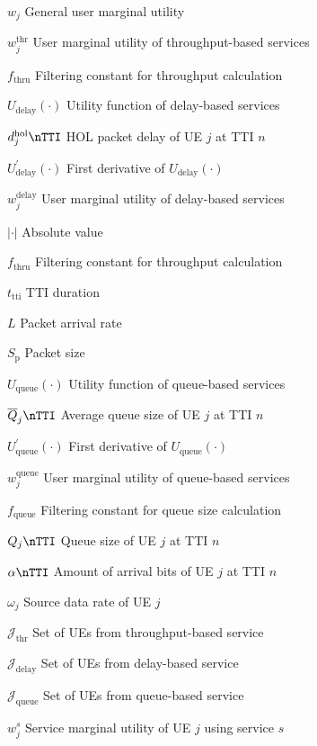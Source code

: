 \begin{simbolos}
	\item[$ w_j $ ] General user marginal utility
	\item[$ w^{\mathrm{thr}}_j $ ] User marginal utility of throughput-based services
	\item[$ f_{\mathrm{thru}} $ ] Filtering constant for throughput calculation
	\item[$ U_{\mathrm{delay}}\left( \cdot \right) $ ] Utility function of delay-based services
	\item[$ d_{j}^\mathrm{hol}\nTTI  $ ] HOL packet delay of UE $j$ at TTI $n$
	\item[$ U_{\mathrm{delay}}^{'}\left( \cdot \right) $] First derivative of $ U_{\mathrm{delay}}\left( \cdot \right) $
	\item[$ w^{\mathrm{delay}}_j $ ] User marginal utility of delay-based services
	\item[$ |\cdot| $] Absolute value
	\item[$ f_{\mathrm{thru}} $ ] Filtering constant for throughput calculation
	\item[$ t_{\mathrm{tti}} $] TTI duration
	\item[$ L $] Packet arrival rate
	\item[$ S_\mathrm{p} $] Packet size
	\item[$ U_{\mathrm{queue}}\left( \cdot \right) $ ] Utility function of queue-based services
	\item[$ \overline{Q}_{j}\nTTI  $ ] Average queue size of UE $j$ at TTI $n$
	\item[$ U_{\mathrm{queue}}^{'}\left( \cdot \right) $] First derivative of $ U_{\mathrm{queue}}\left( \cdot \right) $
	\item[$ w^{\mathrm{queue}}_j $ ] User marginal utility of queue-based services
	\item[$ f_{\mathrm{queue}} $ ] Filtering constant for queue size calculation
	\item[$ Q_{j}\nTTI  $] Queue size of UE $j$ at TTI $n$
	\item[$ \alpha{\nTTI } $] Amount of arrival bits of UE $j$ at TTI $n$
	\item[$ \omega_j $] Source data rate of UE $j$
	\item[$ \mathcal{J}_{\mathrm{thr}} $] Set of UEs from throughput-based service
	\item[$ \mathcal{J}_{\mathrm{delay}} $] Set of UEs from delay-based service
	\item[$ \mathcal{J}_{\mathrm{queue}} $] Set of UEs from queue-based service
	\item[$ w^{s}_j $ ] Service marginal utility of UE $j$ using service $s$

\end{simbolos}
